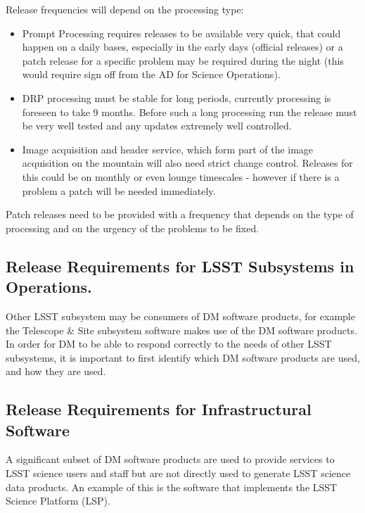 Release frequencies will depend on the processing type:
\begin{itemize}
\item Prompt Processing requires releases to be available very quick, that could happen on a daily bases, especially in the early days (official releases)
 or a  patch release  for a specific problem may be required during the night (this would require sign off from the \gls{AD} for Science \gls{Operations}).
\item \gls{DRP} processing  must be stable for long periods, currently processing is foreseen to take 9 months.  Before such a long processing run the release must be very well tested and any updates extremely well controlled.
\item Image acquisition and header service, which form part of the image acquisition on the mountain will also need strict change control. Releases for this could be on monthly or even lounge timescales - however if there is a problem a patch will be needed immediately.
\end{itemize}

Patch releases need to be provided with a frequency that depends on the type of processing
and on the urgency of the problems to be fixed.


\subsection{Release Requirements for \gls{LSST} Subsystems in \gls{Operations}.} \label{sec:otherreqs}

Other \gls{LSST} subsystem may be consumers of \gls{DM} software products, for example the Telescope \& Site subsystem software makes use of the \gls{DM} software products. 
In order for \gls{DM} to be able to respond correctly to the needs of other \gls{LSST} subsystems, it is important to first identify which \gls{DM} software products are used, and how they are used.


\subsection{Release Requirements for Infrastructural Software} \label{sec:infreqs}

A significant subset of \gls{DM} software products are used to provide services to \gls{LSST} science users and staff but are not directly used to generate \gls{LSST} science data products. An example of this is the software that implements the \gls{LSST} \gls{Science Platform} (\gls{LSP}).

